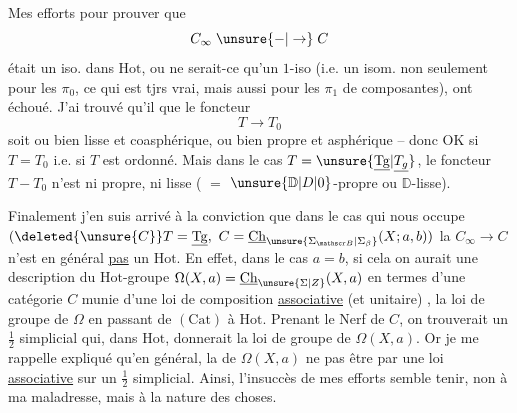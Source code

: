 Mes efforts pour prouver que 
\[
C_\infty\mathrel{\unsure{-|\to}}C
\]
était un iso. dans $\mathrm{Hot}$, ou ne serait-ce qu'un $1$-iso (i.e. un isom. non seulement pour les $\pi_0$, ce qui est tjrs vrai, mais aussi pour les $\pi_1$ de   composantes), ont échoué. J'ai trouvé qu'il  que le foncteur
\[
T\longrightarrow T_0
\]
soit ou bien lisse et coasphérique, ou bien propre et asphérique -- donc  OK si $T=T_0$ i.e. si $T$ est ordonné. Mais dans le cas $T=\unsure{\underline{\mathrm{Tg}}|\underline{T_g}}$, le foncteur $T\mathrel{-}T_0$ n'est ni propre, ni lisse ( $=$ $\unsure{\mathbb D|D|0}$-propre ou $\mathbb D$-lisse).

Finalement j'en suis arrivé à la conviction que dans le cas qui nous occupe $(\deleted{\unsure{C}}T=\underline{\mathrm{Tg}},\ C=\underline{\mathrm{Ch}}_{\unsure{\Sigma_{\mathscr B}|\Sigma_\beta}}(X;a,b))$ la   $C_\infty\longrightarrow C$ n'est en général \uline{pas} un   $\mathrm{Hot}$. En effet, dans le cas $a=b$,  si cela
on aurait une description du $\mathrm{Hot}$-groupe $\Omega(X,a)=\underline{\mathrm{Ch}}_{\unsure{\Sigma|Z}}(X,a)$ en termes d'une
 catégorie $C$ munie d'une loi de composition \uline{associative} (et unitaire) ,  la loi de groupe de $\Omega$ en passant de $(\mathrm{Cat})$ à $\mathrm{Hot}$. Prenant le Nerf de $C$, on trouverait un  $\frac12$ simplicial qui, dans $\mathrm{Hot}$, donnerait la loi de groupe de $\Omega(X,a)$. Or je me rappelle  expliqué qu'en général, la  de $\Omega(X,a)$ ne  pas être  par une loi \uline{associative} sur un  $\frac12$ simplicial. Ainsi, l'insuccès de mes efforts semble tenir, non à ma maladresse, mais à la nature des choses.

